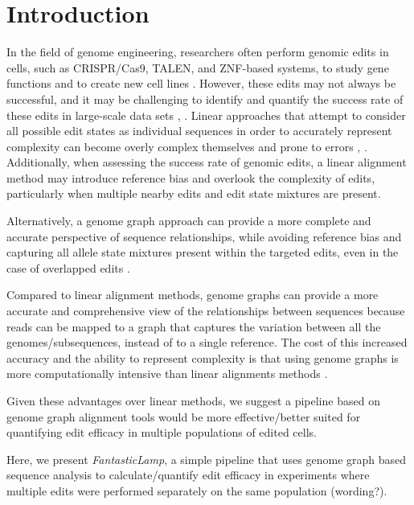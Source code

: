 \documentclass{bioinfo}
\theoremstyle{definition}
\begin{document}
\section{Introduction}
\label{sec:introduction}
In the field of genome engineering, researchers often perform genomic edits in cells, such as CRISPR/Cas9, TALEN, and ZNF-based systems, to study gene functions and to create new cell lines \citep{gaj2013zfn}.
However, these edits may not always be successful, and it may be challenging to identify and quantify the success rate of these edits in large-scale data sets \citep{guell2014genome}, \citep{van2020delivery}.
Linear approaches that attempt to consider all possible edit states as individual sequences in order to accurately represent complexity can become overly complex themselves and prone to errors \citep{huang2013short}, \citep{mun2021leviosam}.
Additionally, when assessing the success rate of genomic edits, a linear alignment method may introduce reference bias and overlook the complexity of edits, particularly when multiple nearby edits and edit state mixtures are present.


Alternatively, a genome graph approach can provide a more complete and accurate perspective of sequence relationships, while avoiding reference bias and capturing all allele state mixtures present within the targeted edits, even in the case of overlapped edits \citep{eggertsson2017graphtyper}.

Compared to linear alignment methods, genome graphs can provide a more accurate and comprehensive view \citep{garrison2018variation} of the relationships between sequences \citep{paten2017genome} because reads can be mapped to a graph that captures the variation between all the genomes/subsequences, instead of to a single reference. 
The cost of this increased accuracy and the ability to represent complexity is that using genome graphs is more computationally intensive than linear alignments methods \citep{rakocevic2019fast}.

Given these advantages over linear methods, we suggest a pipeline based on genome graph alignment tools would be more effective/better suited for quantifying edit efficacy in multiple populations of edited cells. 



Here, we present \textit{FantasticLamp}, a simple pipeline that uses genome graph based sequence analysis to calculate/quantify edit efficacy in experiments where multiple edits were performed separately on the same population (wording?). 
\end{document}
